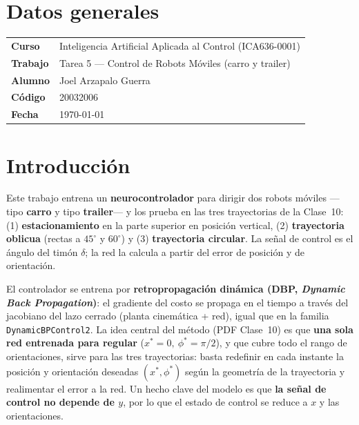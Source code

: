 \documentclass[11pt,a4paper]{article}
\newcommand{\code}[1]{\texttt{\small #1}}
\begin{document}
\section{Datos generales}
\begin{center}
\renewcommand{\arraystretch}{1.3}
\begin{tabular}{ll}
\toprule
\textbf{Curso} & Inteligencia Artificial Aplicada al Control (ICA636-0001) \\
\textbf{Trabajo} & Tarea 5 --- Control de Robots Móviles (carro y trailer) \\
\textbf{Alumno} & Joel Arzapalo Guerra \\
\textbf{Código} & 20032006 \\
\textbf{Fecha} & \today \\
\bottomrule
\end{tabular}
\end{center}
\vspace{0.4cm}

\section{Introducción}
Este trabajo entrena un \textbf{neurocontrolador} para dirigir dos robots móviles —tipo
\textbf{carro} y tipo \textbf{trailer}— y los prueba en las tres trayectorias de la
Clase~10: (1) \textbf{estacionamiento} en la parte superior en posición vertical,
(2) \textbf{trayectoria oblicua} (rectas a $45^\circ$ y $60^\circ$) y (3) \textbf{trayectoria
circular}. La señal de control es el ángulo del timón $\delta$; la red la calcula a
partir del error de posición y de orientación.

El controlador se entrena por \textbf{retropropagación dinámica (DBP, \emph{Dynamic Back
Propagation})}: el gradiente del
costo se propaga en el tiempo a través del jacobiano del lazo cerrado
(planta cinemática + red), igual que en la familia \code{DynamicBPControl2}. La idea
central del método (PDF Clase~10) es que \textbf{una sola red entrenada para regular}
($x^*=0,\ \phi^*=\pi/2$), y que cubre todo el rango de orientaciones, sirve para las tres
trayectorias: basta redefinir en cada instante la posición y orientación deseadas
$(x^*,\phi^*)$ según la geometría de la trayectoria y realimentar el error a la red. Un
hecho clave del modelo es que \textbf{la señal de control no depende de $y$}, por lo que
el estado de control se reduce a $x$ y las orientaciones.
\end{document}
